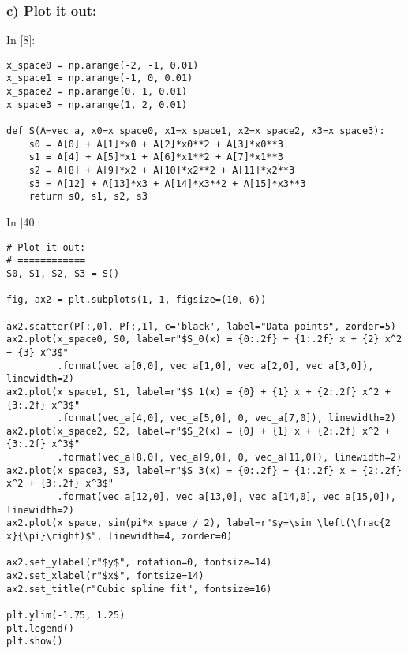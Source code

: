 \documentclass[11pt]{article}
\newif\ifcode
\newif\ifleftmargins
\newlength{\promptlength}
\newcommand{\prompt}[3]{
        \needspace{1.1cm}
        \settowidth{\promptlength}{ #1 [#3] }
        \ifleftmargins\hspace{-\promptlength}\hspace{-5pt}\fi
        {\color{#2}#1 [#3]:}
        \ifleftmargins\vspace{-2.7ex}\fi
    }
\begin{document}
    \hypertarget{c-plot-it-out}{%
\subsubsection{c) Plot it out:}\label{c-plot-it-out}}

    
\prompt{In}{incolor}{8}
\codetrue
\begin{tcolorbox}[breakable, size=fbox, boxrule=1pt, pad at break*=1mm, colback=cellbackground, colframe=cellborder]
\begin{verbatim}
x_space0 = np.arange(-2, -1, 0.01)
x_space1 = np.arange(-1, 0, 0.01)
x_space2 = np.arange(0, 1, 0.01)
x_space3 = np.arange(1, 2, 0.01)

def S(A=vec_a, x0=x_space0, x1=x_space1, x2=x_space2, x3=x_space3):
    s0 = A[0] + A[1]*x0 + A[2]*x0**2 + A[3]*x0**3
    s1 = A[4] + A[5]*x1 + A[6]*x1**2 + A[7]*x1**3
    s2 = A[8] + A[9]*x2 + A[10]*x2**2 + A[11]*x2**3
    s3 = A[12] + A[13]*x3 + A[14]*x3**2 + A[15]*x3**3
    return s0, s1, s2, s3
\end{verbatim}
\end{tcolorbox}
\codefalse

    
\prompt{In}{incolor}{40}
\codetrue
\begin{tcolorbox}[breakable, size=fbox, boxrule=1pt, pad at break*=1mm, colback=cellbackground, colframe=cellborder]
\begin{verbatim}
# Plot it out:
# ============
S0, S1, S2, S3 = S()

fig, ax2 = plt.subplots(1, 1, figsize=(10, 6))

ax2.scatter(P[:,0], P[:,1], c='black', label="Data points", zorder=5)
ax2.plot(x_space0, S0, label=r"$S_0(x) = {0:.2f} + {1:.2f} x + {2} x^2 + {3} x^3$"
         .format(vec_a[0,0], vec_a[1,0], vec_a[2,0], vec_a[3,0]), linewidth=2)
ax2.plot(x_space1, S1, label=r"$S_1(x) = {0} + {1} x + {2:.2f} x^2 + {3:.2f} x^3$"
         .format(vec_a[4,0], vec_a[5,0], 0, vec_a[7,0]), linewidth=2)
ax2.plot(x_space2, S2, label=r"$S_2(x) = {0} + {1} x + {2:.2f} x^2 + {3:.2f} x^3$"
         .format(vec_a[8,0], vec_a[9,0], 0, vec_a[11,0]), linewidth=2)
ax2.plot(x_space3, S3, label=r"$S_3(x) = {0:.2f} + {1:.2f} x + {2:.2f} x^2 + {3:.2f} x^3$"
         .format(vec_a[12,0], vec_a[13,0], vec_a[14,0], vec_a[15,0]), linewidth=2)
ax2.plot(x_space, sin(pi*x_space / 2), label=r"$y=\sin \left(\frac{2 x}{\pi}\right)$", linewidth=4, zorder=0)

ax2.set_ylabel(r"$y$", rotation=0, fontsize=14)
ax2.set_xlabel(r"$x$", fontsize=14)
ax2.set_title(r"Cubic spline fit", fontsize=16)

plt.ylim(-1.75, 1.25)
plt.legend()
plt.show()
\end{verbatim}
\end{tcolorbox}
\codefalse
\end{document}
